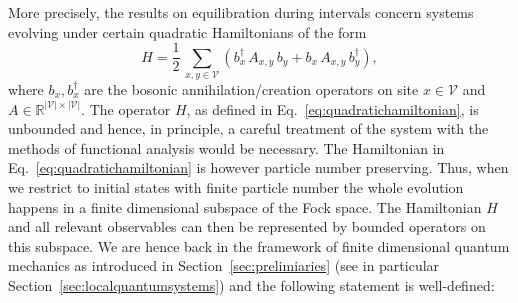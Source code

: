 \documentclass[a4paper,12pt,listof=totoc,index=totoc,bibliography=totoc,headsepline=false,headings=normal,BCOR16.153846mm,DIV12,headinclude,twoside,cleardoublepage=empty,numbers=noenddot,final]{scrreprt}
\theoremstyle{mystyle}
\numberwithin{equation}{section}
\numberwithin{figure}{section}
\numberwithin{lemma}{section}
\numberwithin{theorem}{section}
\numberwithin{corollary}{section}
\numberwithin{definition}{section}
\numberwithin{conjecture}{section}
\numberwithin{observation}{section}
\newcommand{\+}{\mkern2mu}
\newcommand{\texteqref}[1]{Eq.~\eqref{#1}}
\renewcommand{\H}{H}
\newcommand{\Vset}{\mathcal{V}}
\DeclareMathOperator{\1}{\mathds{1}}
\newcommand{\mb}[1]{\mathbb{#1}}
\newcommand{\R}{\mb{R}}
\begin{document}
More precisely, the results on equilibration during intervals concern systems evolving under certain quadratic Hamiltonians of the form
\begin{equation} \label{eq:quadratichamiltonian}
  \H = \frac{1}{2}\,\sum_{x,y\in\Vset} \left( b_x^\dagger\,A_{x,y}\,b_y + b_x\,A_{x,y}\,b_y^\dagger \right) ,
\end{equation}
where $b_x,b_x^\dagger$ are the bosonic annihilation/creation operators on site $x \in \Vset$ and $A \in \R^{|\Vset|\times|\Vset|}$.
The operator $\H$, as defined in \texteqref{eq:quadratichamiltonian}, is unbounded and hence, in principle, a careful treatment of the system with the methods of functional analysis \cite{Reed1980,Reed1975} would be necessary.
The Hamiltonian in \texteqref{eq:quadratichamiltonian} is however particle number preserving.
Thus, when we restrict to initial states with finite particle number the whole evolution happens in a finite dimensional subspace of the Fock space.
The Hamiltonian $\H$ and all relevant observables can then be represented by bounded operators on this subspace.
We are hence back in the framework of finite dimensional quantum mechanics as introduced in Section~\ref{sec:prelimiaries} (see in particular Section~\ref{sec:localquantumsystems}) and the following statement is well-defined:
\end{document}
